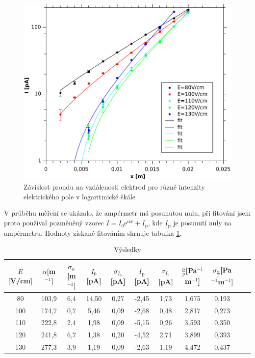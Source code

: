 \documentclass[12pt]{article}
\begin{document}
\begin{figure}[htbp]
\begin{center}
\includegraphics[width=12cm]{log.pdf}
\caption{Závislost proudu na vzdálenosti elektrod pro různé intenzity elektrického pole v logaritmické škále}
\end{center}
\label{lni=fx}
\end{figure}

V průběhu měření se ukázalo, že ampérmetr má posunutou nulu, při fitování jsem proto používal pozměněný vzorec $I = I_0 \mathrm{e}^{\alpha x} + I_\mathrm{p}$, kde $I_\mathrm{p}$ je posunutí nuly na ampérmetru. Hodnoty získané fitováním shrnuje tabulka \ref{vysl}.

\begin{table}[htbp]
\begin{center}
\begin{tabular}{|c|c|c|c|c|c|c|c|c|c|c|}
\hline
$E$[V/cm] & $\alpha$[m$^{-1}$] & $\sigma_\alpha$[m$^{-1}$] & $I_0$[pA] & $\sigma_{I_0}$[pA] & $I_\mathrm{p}$[pA] & $\sigma_{I_\mathrm{p}}$[pA] & $\frac{\alpha}{p}$[Pa$^{-1}$m$^{-1}$] & $\sigma_\frac{\alpha}{p}$[Pa$^{-1}$m$^{-1}$] \\ \hline
80 & 103,9 & 6,4 & 14,50 & 0,27 & -2,45 & 1,73 & 1,675 & 0,193 \\ \hline
100 & 174,7 & 0,7 & 5,46 & 0,09 & -2,68 & 0,48 & 2,817 & 0,273 \\ \hline
110 & 222,8 & 2,4 & 1,98 & 0,09 & -5,15 & 0,26 & 3,593 & 0,350 \\ \hline
120 & 241,8 & 6,7 & 1,38 & 0,20 & -4,52 & 2,71 & 3,899 & 0,393 \\ \hline
130 & 277,3 & 3,9 & 1,19 & 0,09 & -2,63 & 1,19 & 4,472 & 0,437 \\ \hline
\end{tabular}
\caption{Výsledky}
\label{vysl}
\end{center}
\end{table}
\end{document}
